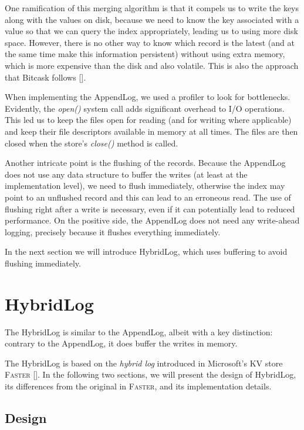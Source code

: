 One ramification of this merging algorithm is that it compels us to write the keys along with the values on disk, because we need to know the key associated with a value so that we can query the index appropriately, leading us to using more disk space. However, there is no other way to know which record is the latest (and at the same time make this information persistent) without using extra memory, which is more expensive than the disk and also volatile. This is also the approach that Bitcask follows [\cite{bitcask}].

When implementing the AppendLog, we used a profiler to look for bottlenecks. Evidently, the \textit{open()} system call adds significant overhead to I/O operations. This led us to keep the files open for reading (and for writing where applicable) and keep their file descriptors available in memory at all times. The files are then closed when the store's \textit{close()} method is called.

Another intricate point is the flushing of the records. Because the AppendLog does not use any data structure to buffer the writes (at least at the implementation level), we need to flush immediately, otherwise the index may point to an unflushed record and this can lead to an erroneous read. The use of flushing right after a write is necessary, even if it can potentially lead to reduced performance. On the positive side, the AppendLog does not need any write-ahead logging, precisely because it flushes everything immediately.

In the next section we will introduce HybridLog, which uses buffering to avoid flushing immediately.

\section{HybridLog}

The HybridLog is similar to the AppendLog, albeit with a key distinction: contrary to the AppendLog, it does buffer the writes in memory.

The HybridLog is based on the \textit{hybrid log} introduced in Microsoft's KV store \textsc{Faster} [\cite{faster}]. In the following two sections, we will present the design of HybridLog, its differences from the original in \textsc{Faster}, and its implementation details.

\subsection{Design}

